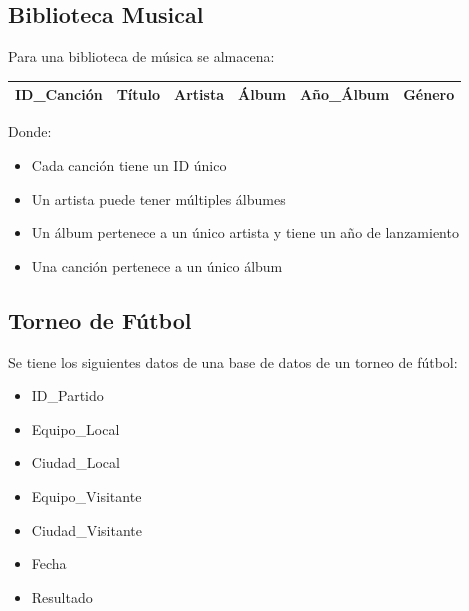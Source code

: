 \documentclass[12pt]{article}
\begin{document}
\subsection{Biblioteca Musical}
Para una biblioteca de música se almacena:
\vspace{0.5em}
\begin{center}
\begin{tabular}{|l|l|l|l|l|l|}
\hline
ID\_Canción & Título & Artista & Álbum & Año\_Álbum & Género \\
\hline
\end{tabular}
\end{center}

Donde:
\begin{itemize}
    \item Cada canción tiene un ID único
    \item Un artista puede tener múltiples álbumes
    \item Un álbum pertenece a un único artista y tiene un año de lanzamiento
    \item Una canción pertenece a un único álbum
\end{itemize}

\subsection{Torneo de Fútbol}
Se tiene los siguientes datos de una base de datos de un torneo de fútbol:

\vspace{0.5em}

\begin{minipage}[t]{0.48\textwidth}
\begin{itemize}
    \item ID\_Partido
    \item Equipo\_Local
    \item Ciudad\_Local
    \item Equipo\_Visitante
\end{itemize}
\end{minipage}
\hfill
\begin{minipage}[t]{0.48\textwidth}
\begin{itemize}
    \item Ciudad\_Visitante
    \item Fecha
    \item Resultado
\end{itemize}
\end{minipage}

\vspace{1em}
\end{document}
